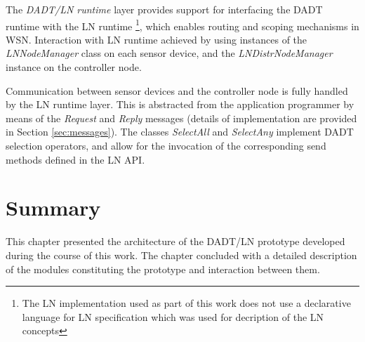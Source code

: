 The \emph{DADT/LN runtime} layer provides support for interfacing the DADT
runtime with the LN runtime \footnote{The LN implementation
used as part of this work does not use a declarative language for LN
specification which was used for decription of the LN concepts}, which enables
routing and scoping mechanisms in WSN. 
Interaction with LN runtime achieved by using instances of
the \emph{LNNodeManager} class on each sensor device, and the \emph{LNDistrNodeManager} instance on the controller node.

Communication between sensor devices and the controller node is fully handled by
the LN runtime layer. This is abstracted from the application programmer by means of the
\emph{Request} and \emph{Reply} messages (details of implementation are provided
in Section \ref{sec:messages}). The classes \emph{SelectAll} and \emph{SelectAny} implement
DADT selection operators, and allow for the invocation of the corresponding send methods defined in the LN API.

\section{Summary}

This chapter presented the architecture of the DADT/LN
prototype developed during the course of this work. The chapter concluded with a
detailed description of the modules constituting the prototype and 
interaction between them.

